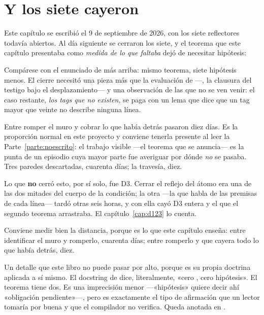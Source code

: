 \section{Y los siete cayeron}

Este capítulo se escribió el 9 de septiembre de 2026, con los siete reflectores todavía abiertos.
Al día siguiente se cerraron los siete, y el teorema que este capítulo presentaba como \emph{medida
de lo que faltaba} dejó de necesitar hipótesis:



Compárese con el enunciado de más arriba: mismo teorema, siete hipótesis menos. El cierre necesitó
una pieza más que la evaluación de  —, la clausura del
testigo bajo el desplazamiento— y una observación de las que no se ven venir: el caso restante,
\emph{los tags que no existen}, se paga con un lema que dice que un tag mayor que veinte no
describe ninguna línea.

\begin{leccion}
Entre romper el muro y cobrar lo que había detrás pasaron diez días. Es la proporción normal en
este proyecto y conviene tenerla presente al leer la Parte~\ref{parte:noescrito}: el trabajo
visible —el teorema que se anuncia— es la punta de un episodio cuya mayor parte fue averiguar por
dónde \emph{no} se pasaba. Tres paredes descartadas, cuarenta días; la travesía, diez.
\end{leccion}

\begin{observacion}
Lo que \textbf{no} cerró esto, por sí solo, fue D3. Cerrar el reflejo del átomo  era
una de las dos mitades del cuerpo de la condición; la otra —la que habla de las premisas de cada
línea— tardó otras seis horas, y con ella cayó D3 entera y el  que el segundo teorema
arrastraba. El capítulo~\ref{cap:d123} lo cuenta.

Conviene medir bien la distancia, porque es lo que este capítulo enseña: entre identificar el muro
y romperlo, cuarenta días; entre romperlo y que cayera todo lo que había detrás, diez.
\end{observacion}

\begin{observacion}
Un detalle que este libro no puede pasar por alto, porque es su propia doctrina aplicada a sí mismo.
El docstring de  dice, literalmente, «cero , cero hipótesis».
El teorema tiene dos. Es una imprecisión menor —«hipótesis» quiere decir ahí «obligación
pendiente»—, pero es exactamente el tipo de afirmación que un lector tomaría por buena y que el
compilador no verifica. Queda anotada en .
\end{observacion}
